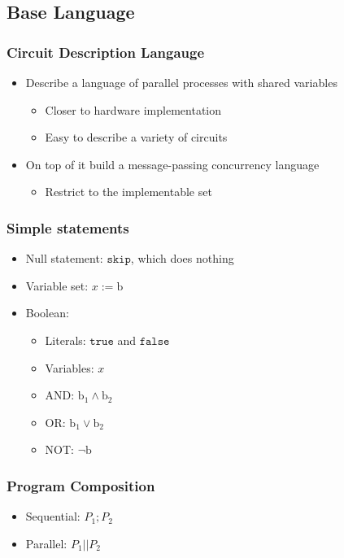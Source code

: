 \documentclass[compress]{beamer}
\begin{document}
\subsection{Base Language}
\begin{frame}
\frametitle{Circuit Description Langauge}
\begin{itemize}
\item Describe a language of parallel processes with shared variables
\begin{itemize}
\item Closer to hardware implementation
\item Easy to describe a variety of circuits
\end{itemize}
\item On top of it build a message-passing concurrency language
\begin{itemize}
\item Restrict to the implementable set
\end{itemize}
\end{itemize}
\end{frame}
\begin{frame}
\frametitle{Simple statements}
\begin{itemize}
\item Null statement: $\texttt{skip}$, which does nothing
\item Variable set: $x := \mathrm{b}$
\end{itemize}
\end{frame}
\begin{frame}
\begin{itemize}
\item Boolean:
\begin{itemize}
\item Literals: $\texttt{true}$ and $\texttt{false}$
\item Variables: $x$
\item AND: $\mathrm{b_1} \land \mathrm{b_2}$
\item OR: $\mathrm{b_1} \lor \mathrm{b_2}$
\item NOT: $\lnot \mathrm{b}$
\end{itemize}
\end{itemize}
\end{frame}
\begin{frame}
\frametitle{Program Composition}
\begin{itemize}
\item Sequential: $P_1; P_2$
\item Parallel: $P_1 || P_2$
\end{itemize}
\end{frame}
\end{document}

